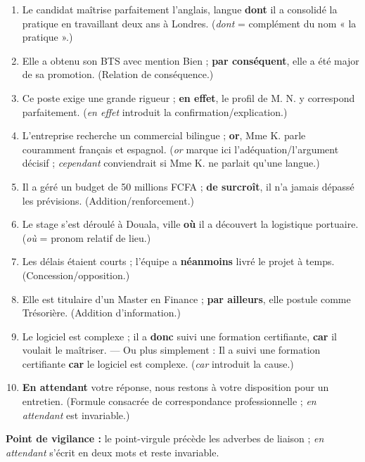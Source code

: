 \documentclass[11pt]{article}
\begin{document}
\begin{corrige}
\begin{enumerate}
\item Le candidat maîtrise parfaitement l'anglais, langue \textbf{dont} il a consolidé la pratique en travaillant deux ans à Londres. (\emph{dont} = complément du nom « la pratique ».)
\item Elle a obtenu son BTS avec mention Bien ; \textbf{par conséquent}, elle a été major de sa promotion. (Relation de conséquence.)
\item Ce poste exige une grande rigueur ; \textbf{en effet}, le profil de M. N. y correspond parfaitement. (\emph{en effet} introduit la confirmation/explication.)
\item L'entreprise recherche un commercial bilingue ; \textbf{or}, Mme K. parle couramment français et espagnol. (\emph{or} marque ici l'adéquation/l'argument décisif ; \emph{cependant} conviendrait si Mme K. ne parlait qu'une langue.)
\item Il a géré un budget de 50 millions FCFA ; \textbf{de surcroît}, il n'a jamais dépassé les prévisions. (Addition/renforcement.)
\item Le stage s'est déroulé à Douala, ville \textbf{où} il a découvert la logistique portuaire. (\emph{où} = pronom relatif de lieu.)
\item Les délais étaient courts ; l'équipe a \textbf{néanmoins} livré le projet à temps. (Concession/opposition.)
\item Elle est titulaire d'un Master en Finance ; \textbf{par ailleurs}, elle postule comme Trésorière. (Addition d'information.)
\item Le logiciel est complexe ; il a \textbf{donc} suivi une formation certifiante, \textbf{car} il voulait le maîtriser. — Ou plus simplement : Il a suivi une formation certifiante \textbf{car} le logiciel est complexe. (\emph{car} introduit la cause.)
\item \textbf{En attendant} votre réponse, nous restons à votre disposition pour un entretien. (Formule consacrée de correspondance professionnelle ; \emph{en attendant} est invariable.)
\end{enumerate}
\textbf{Point de vigilance :} le point-virgule précède les adverbes de liaison ; \emph{en attendant} s'écrit en deux mots et reste invariable.
\end{corrige}
\end{document}
